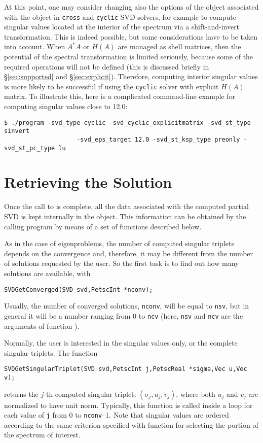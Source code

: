 At this point, one may consider changing also the options of the  object associated with the  object in \texttt{cross} and \texttt{cyclic} SVD solvers, for example to compute singular values located at the interior of the spectrum via a shift-and-invert transformation. This is indeed possible, but some considerations have to be taken into account. When $A^*A$ or $H(A)$ are managed as shell matrices, then the potential of the spectral transformation is limited seriously, because some of the required operations will not be defined (this is discussed briefly in \S\ref{sec:supported} and \S\ref{sec:explicit}). Therefore, computing interior singular values is more likely to be successful if using the \texttt{cyclic} solver with explicit $H(A)$ matrix. To illustrate this, here is a complicated command-line example for computing singular values close to 12.0:
\begin{Verbatim}[fontsize=\small]
	$ ./program -svd_type cyclic -svd_cyclic_explicitmatrix -svd_st_type sinvert
                    -svd_eps_target 12.0 -svd_st_ksp_type preonly -svd_st_pc_type lu
\end{Verbatim}

\section{Retrieving the Solution}

Once the call to  is complete, all the data associated with the computed partial SVD is kept internally in the  object. This information can be obtained by the calling program by means of a set of functions described below.

As in the case of eigenproblems, the number of computed singular triplets depends on the convergence and, therefore, it may be different from the number of solutions requested by the user. So the first task is to find out how many solutions are available, with
	\begin{Verbatim}[fontsize=\small]
	SVDGetConverged(SVD svd,PetscInt *nconv);
	\end{Verbatim}
Usually, the number of converged solutions, \texttt{nconv}, will be equal to \texttt{nsv}, but in general it will be a number ranging from 0 to \texttt{ncv} (here, \texttt{nsv} and \texttt{ncv} are the arguments of function ).

Normally, the user is interested in the singular values only, or the complete singular triplets. The function
	\begin{Verbatim}[fontsize=\small]
	SVDGetSingularTriplet(SVD svd,PetscInt j,PetscReal *sigma,Vec u,Vec v);
	\end{Verbatim}
returns the $j$-th computed singular triplet, $(\sigma_j,u_j,v_j)$, where both $u_j$ and $v_j$ are normalized to have unit norm. Typically, this function is called inside a loop for each value of \texttt{j} from 0 to \texttt{nconv}--1. Note that singular values are ordered according to the same criterion specified with function  for selecting the portion of the spectrum of interest.


